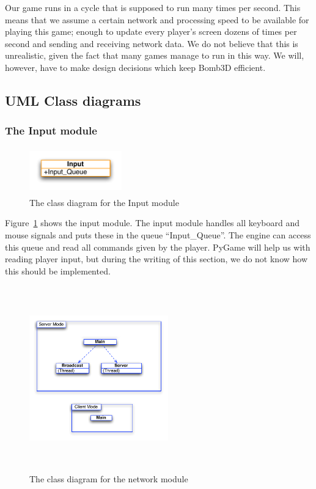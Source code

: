         Our game runs in a cycle that is supposed to run many times per second. This means that we assume a certain network and processing speed to be available for playing this game; enough to update every player's screen dozens of times per second and sending and receiving network data. We do not believe that this is unrealistic, given the fact that many games manage to run in this way. We will, however, have to make design decisions which keep Bomb3D efficient.


      \newpage
      \subsection{UML Class diagrams}

        \subsubsection{The Input module} %
        \label{ssub:the_input_module}

          \begin{figure}[!ht]
            \centering
            \includegraphics[width=4cm,height=2cm]{diagrams/UML_input}
            \caption{The class diagram for the Input module}
            \label{fig:UML_input}
          \end{figure}

          Figure~\ref{fig:UML_input} shows the input module. The input module handles all keyboard and mouse signals and puts these in the queue ``Input\_Queue''. The engine can access this queue and read all commands given by the player. PyGame will help us with reading player input, but during the writing of this section, we do not know how this should be implemented.

        \begin{figure}[!ht]
          \centering
          \includegraphics[width=6cm,height=8cm]{diagrams/UML_multicast}
          \caption{The class diagram for the network module} \label{fig:UML_multicast}
        \end{figure}

